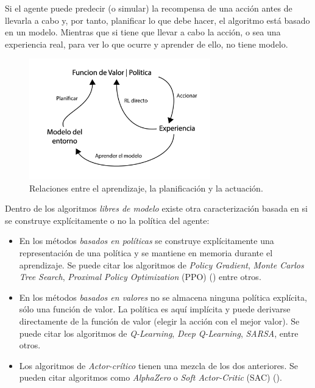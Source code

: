 Si el agente puede predecir (o simular) la recompensa de una acción antes de llevarla a cabo y, por tanto, planificar lo que debe hacer, el algoritmo está basado en un modelo. Mientras que si tiene que llevar a cabo la acción, o sea una experiencia real, para ver lo que ocurre y aprender de ello, no tiene modelo.

\begin{figure}[ht!]
    \centering
    \includegraphics[width=0.7\textwidth]{Graphics/rl-strategies.png}
    \caption{Relaciones entre el aprendizaje, la planificación y la actuación.}
    \label{fig:rl-strategies}
\end{figure}

Dentro de los algoritmos  \textit{libres de modelo} existe otra caracterización basada en si se construye explícitamente o no la política del agente:

\begin{itemize}
\item En los métodos \textit{basados en políticas} se construye explícitamente una representación de una política y se mantiene en memoria durante el aprendizaje. Se puede citar los algoritmos de \textit{Policy Gradient}, \textit{Monte Carlos Tree Search}, \textit{Proximal Policy Optimization} (PPO) (\cite{schulman2017proximal})  entre otros.

\item En los métodos \textit{basados en valores} no se almacena ninguna política explícita, sólo una función de valor. La política es aquí implícita y puede derivarse directamente de la función de valor (elegir la acción con el mejor valor). Se puede citar los algoritmos de \textit{Q-Learning}, \textit{Deep Q-Learning}, \textit{SARSA}, entre otros.

\item Los algoritmos de \textit{Actor-crítico} tienen una mezcla de los dos anteriores. Se pueden citar algoritmos como \textit{AlphaZero} o \textit{Soft Actor-Critic} (SAC) (\cite{haarnoja2018soft}).
\end{itemize}

